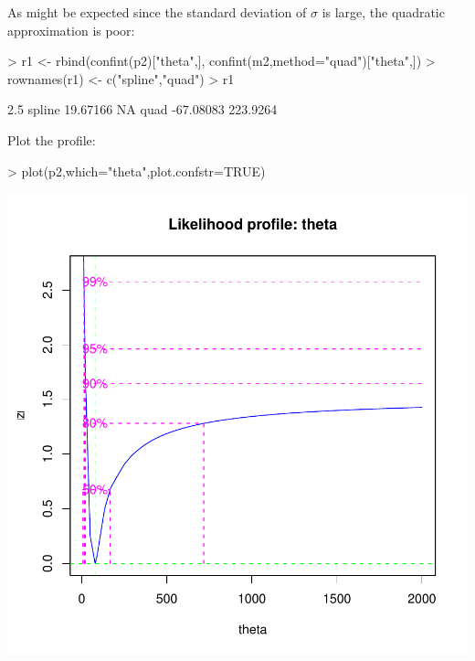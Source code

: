 \documentclass{article}
\begin{document}
As might be expected since the standard deviation
of $\sigma$ is large, the quadratic approximation is
poor:

\begin{Schunk}
\begin{Sinput}
> r1 <- rbind(confint(p2)["theta",],
             confint(m2,method="quad")["theta",])
> rownames(r1) <- c("spline","quad")
> r1
\end{Sinput}
\begin{Soutput}
           2.5 %
spline  19.67166       NA
quad   -67.08083 223.9264
\end{Soutput}
\end{Schunk}

Plot the profile:
\begin{Schunk}
\begin{Sinput}
> plot(p2,which="theta",plot.confstr=TRUE)
\end{Sinput}
\end{Schunk}
\includegraphics{mle2-025}
\end{document}

